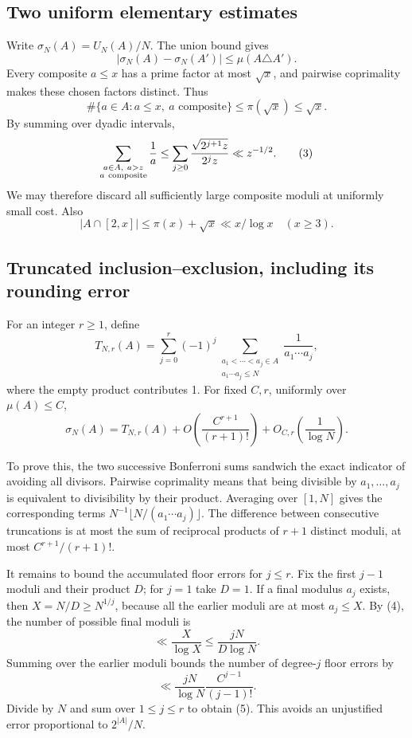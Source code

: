 \subsection*{Two uniform elementary estimates}
Write \(\sigma_N(A)=U_N(A)/N\). The union bound gives
\[
|\sigma_N(A)-\sigma_N(A')|\leq\mu(A\triangle A'). \tag{2}
\]
Every composite \(a\leq x\) has a prime factor at most \(\sqrt x\), and pairwise coprimality makes these chosen factors distinct. Thus
\[
\#\{a\in A:a\leq x,\ a\text{ composite}\}\leq\pi(\sqrt x)\leq\sqrt x.
\]
By summing over dyadic intervals,
\[
\sum_{\substack{a\in A,\ a>z\\a\ {\rm composite}}}\frac1a
\leq\sum_{j\geq0}\frac{\sqrt{2^{j+1}z}}{2^jz}
\ll z^{-1/2}. \tag{3}
\]
We may therefore discard all sufficiently large composite moduli at uniformly small cost. Also
\[
|A\cap[2,x]|\leq\pi(x)+\sqrt x\ll x/\log x\quad(x\geq3). \tag{4}
\]

\subsection*{Truncated inclusion--exclusion, including its rounding error}
For an integer \(r\geq1\), define
\[
T_{N,r}(A)=\sum_{j=0}^r(-1)^j
 \sum_{\substack{a_1<\cdots<a_j\in A\\a_1\cdots a_j\leq N}}
 \frac1{a_1\cdots a_j},
\]
where the empty product contributes 1. For fixed \(C,r\), uniformly over \(\mu(A)\leq C\),
\[
\sigma_N(A)=T_{N,r}(A)
 +O\left(\frac{C^{r+1}}{(r+1)!}\right)
 +O_{C,r}\left(\frac1{\log N}\right). \tag{5}
\]

To prove this, the two successive Bonferroni sums sandwich the exact indicator of avoiding all divisors. Pairwise coprimality means that being divisible by \(a_1,\ldots,a_j\) is equivalent to divisibility by their product. Averaging over \([1,N]\) gives the corresponding terms
\(N^{-1}\lfloor N/(a_1\cdots a_j)\rfloor\).
The difference between consecutive truncations is at most the sum of reciprocal products of \(r+1\) distinct moduli, at most \(C^{r+1}/(r+1)!\).

It remains to bound the accumulated floor errors for \(j\leq r\). Fix the first \(j-1\) moduli and their product \(D\); for \(j=1\) take \(D=1\). If a final modulus \(a_j\) exists, then \(X=N/D\geq N^{1/j}\), because all the earlier moduli are at most \(a_j\leq X\). By (4), the number of possible final moduli is
\[
\ll \frac{X}{\log X}\leq \frac{jN}{D\log N}.
\]
Summing over the earlier moduli bounds the number of degree-\(j\) floor errors by
\[
\ll \frac{jN}{\log N}\frac{C^{j-1}}{(j-1)!}.
\]
Divide by \(N\) and sum over \(1\leq j\leq r\) to obtain (5). This avoids an unjustified error proportional to \(2^{|A|}/N\).

